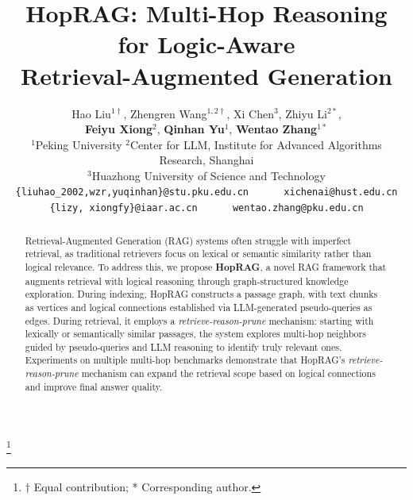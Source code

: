 \documentclass[11pt]{article}
\title{
HopRAG: Multi-Hop Reasoning for Logic-Aware \\
Retrieval-Augmented Generation
}
\author{Hao Liu$^{1\dagger}$, Zhengren Wang$^{1,2\dagger}$, Xi Chen$^{3}$, Zhiyu Li$^{2*}$,\\{\bf Feiyu Xiong$^{2}$}, {\bf Qinhan Yu$^{1}$}, {\bf Wentao Zhang$^{1*}$} \\
$^{1}$Peking University $^{2}$Center for LLM, Institute for Advanced Algorithms Research, Shanghai \\
$^{3}$Huazhong University of Science and Technology \\
\texttt{\{liuhao\_2002,wzr,yuqinhan\}@stu.pku.edu.cn} ~~~~~ \texttt{xichenai@hust.edu.cn} \\ \texttt{\{lizy, xiongfy\}@iaar.ac.cn} ~~~~~ \texttt{wentao.zhang@pku.edu.cn} 
}
\begin{document}
\maketitle
\begingroup
{}
\renewcommand\thefootnote{}\footnote{
$\dagger$ Equal contribution;  * Corresponding author.
}
\addtocounter{footnote}{-1}
\endgroup

\begin{abstract}
Retrieval-Augmented Generation (RAG) systems often struggle with imperfect retrieval, as traditional retrievers focus on lexical or semantic similarity rather than logical relevance. To address this, we propose \textbf{HopRAG}, a novel RAG framework that augments retrieval with logical reasoning through graph-structured knowledge exploration. During indexing, HopRAG constructs a passage graph, with text chunks as vertices and logical connections established via LLM-generated pseudo-queries as edges. During retrieval, it employs a \textit{retrieve-reason-prune} mechanism: starting with lexically or semantically similar passages, the system explores multi-hop neighbors guided by pseudo-queries and LLM reasoning to identify truly relevant ones. Experiments on multiple multi-hop benchmarks demonstrate that HopRAG’s \textit{retrieve-reason-prune} mechanism can expand the retrieval scope based on logical connections and improve final answer quality.

\end{abstract}







\newpage

\end{document}
